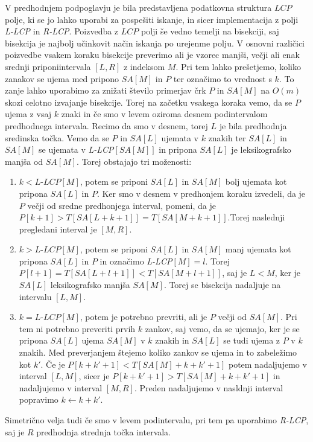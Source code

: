 V predhodnjem podpoglavju je bila predstavljena podatkovna struktura $LCP$ polje, ki se jo lahko uporabi za pospešiti iskanje, in sicer implementacija z polji \textit{L-LCP} in \textit{R-LCP}. Poizvedba z $LCP$ polji še vedno temelji na bisekciji, saj bisekcija je najbolj učinkovit način iskanja po urejenme polju. V osnovni različici poizvedbe vsakem koraku bisekcije preverimo ali je vzorec manjši, večji ali enak srednji priponiintervala $[L,R]$ z indeksom $M$. Pri tem lahko prešetjemo, koliko zanakov se ujema med pripono $SA[M]$ in $P$ ter označimo to vrednost s $k$. To zanje lahko uporabimo za znižati število primerjav črk $P$ in $SA[M]$ na $O(m)$ skozi celotno izvajanje bisekcije. Torej na začetku vsakega koraka vemo, da se $P$ ujema z vsaj $k$ znaki in če smo v levem oziroma desnem podintervalom predhodnega intervala. Recimo da smo v desnem, torej $L$ je bila predhodnja sredinska točka. Vemo da se $P$ in $SA[L]$ ujemata v $k$ znakih ter $SA[L]$ in $SA[M]$ se ujemata v \textit{L-LCP}$[SA[M]]$ in pripona $SA[L]$ je leksikografsko manjša od $SA[M]$. Torej obstajajo tri moženosti:
\begin{enumerate}
    \item $k<\textit{L-LCP}[M]$, potem se priponi $SA[L]$ in $SA[M]$ bolj ujemata kot pripona $SA[L]$ in $P$. Ker smo v desnem v predhonjem koraku izvedeli, da je $P$ večji od sredne predhonjega interval, pomeni, da je $P[k+1]>T[SA[L+k+1]]=T[SA[M+k+1]]$.Torej naslednji pregledani interval je $[M,R]$.
    \item $k>\textit{L-LCP}[M]$, potem se priponi $SA[L]$ in $SA[M]$ manj ujemata kot pripona $SA[L]$ in $P$ in označimo \textit{L-LCP}$[M]=l$. Torej $P[l+1]=T[SA[L+l+1]]<T[SA[M+l+1]]$, saj je $L<M$, ker je $SA[L]$ leksikografsko manjša $SA[M]$. Torej se bisekcija nadaljuje na intervalu $[L,M]$.
    \item $k=\textit{L-LCP}[M]$, potem je potrebno prevriti, ali je $P$ večji od $SA[M]$. Pri tem ni potrebno preveriti prvih $k$ zankov, saj vemo, da se ujemajo, ker je se pripona $SA[L]$ ujema $SA[M]$ v $k$ znakih in $SA[L]$ se tudi ujema z $P$ v $k$ znakih. Med preverjanjem štejemo koliko zankov se ujema in to zabeležimo kot $k'$. Če je $P[k+k'+1]<T[SA[M]+k+k'+1]$ potem nadaljujemo v interval $[L,M]$, sicer je $P[k+k'+1]>T[SA[M]+k+k'+1]$ in nadaljujemo v interval $[M,R]$. Preden nadaljujemo v nasldnji interval popravimo $k\leftarrow k+k'$.
\end{enumerate}
Simetrično velja tudi če smo v levem podintervalu, pri tem pa uporabimo \textit{R-LCP}, saj je $R$ predhodnja strednja točka intervala.

